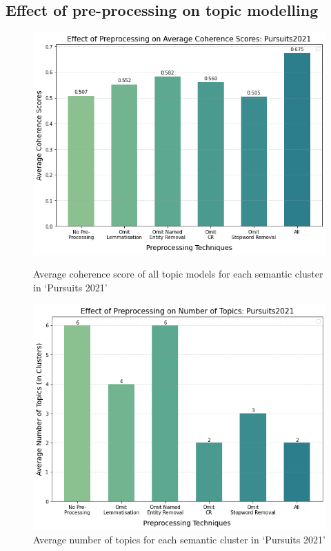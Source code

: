 \subsection{Effect of pre-processing on topic modelling} \label{s:preprocess_topic}

\begin{figure}[H]
  \centering
    \begin{minipage}[t]{.49\linewidth}
      \centering
      \includegraphics[width=\linewidth]{images/eval/coherence_preprocess.png}
      \caption{Average coherence score of all topic models for each semantic cluster in `Pursuits 2021' }
      \label{fig:preprocess_topic}
    \end{minipage}
    \begin{minipage}[t]{.49\textwidth}
      \centering
      \includegraphics[width=\linewidth]{images/eval/preprocessingTopicNo.png}
      \caption{Average number of topics for each semantic cluster in `Pursuits 2021' }
       \label{fig:pre-processing_topic_no}
    \end{minipage}
  \end{figure}
